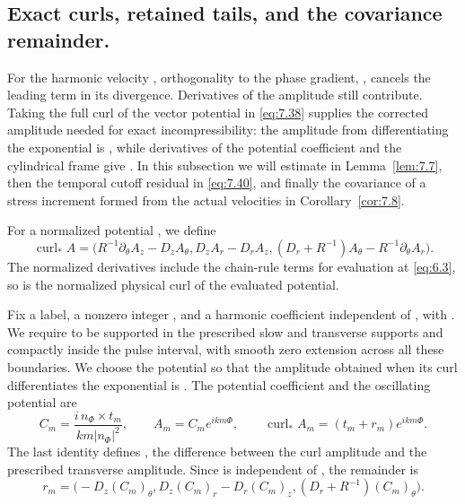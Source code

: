 \subsection{Exact curls, retained tails, and the covariance remainder.}\label{sec:7.4}
For the harmonic velocity
, orthogonality to the phase gradient,
, cancels the leading term in its
divergence. Derivatives of the amplitude  still contribute. Taking the full curl of the vector
potential  in \eqref{eq:7.38} supplies the corrected amplitude
 needed for exact
incompressibility: the amplitude from differentiating the exponential is , while derivatives
of the potential coefficient  and the cylindrical frame give
. In this subsection we
will estimate  in Lemma~\ref{lem:7.7}, then the temporal cutoff residual in
\eqref{eq:7.40}, and finally the
covariance of a stress increment formed from the actual velocities in Corollary~\ref{cor:7.8}.

For a normalized potential , we define
\begin{equation}
  \operatorname{curl}_* A
  =\bigl(R^{-1}\partial_\theta A_z-D_zA_\theta,
         D_zA_r-D_rA_z,
         (D_r+R^{-1})A_\theta-R^{-1}\partial_\theta A_r\bigr).
\tag{7.37}\label{eq:7.37}
\end{equation}
The normalized derivatives include the chain-rule terms for evaluation at \eqref{eq:6.3}, so
 is
the normalized physical curl of the evaluated potential.

Fix a label, a nonzero integer , and a harmonic coefficient
 independent of
, with . We require
 to be supported in the prescribed slow and transverse
supports and compactly inside the pulse interval, with smooth zero extension across all
these boundaries. We choose the potential so that the amplitude obtained when its curl
%
differentiates the exponential is . The potential coefficient
 and the oscillating potential
 are
\begin{equation}
  C_m=\frac{i\,n_\Phi\times t_m}{km|n_\Phi|^2},
  \qquad A_m=C_m e^{ikm\Phi},
  \qquad \operatorname{curl}_*A_m=(t_m+r_m)e^{ikm\Phi}.
\tag{7.38}\label{eq:7.38}
\end{equation}
The last identity defines , the difference between the curl amplitude and the prescribed
transverse amplitude. Since  is independent of
, the remainder  is
\[
  r_m=\bigl(-D_z(C_m)_\theta,
             D_z(C_m)_r-D_r(C_m)_z,
             (D_r+R^{-1})(C_m)_\theta\bigr).
\]

